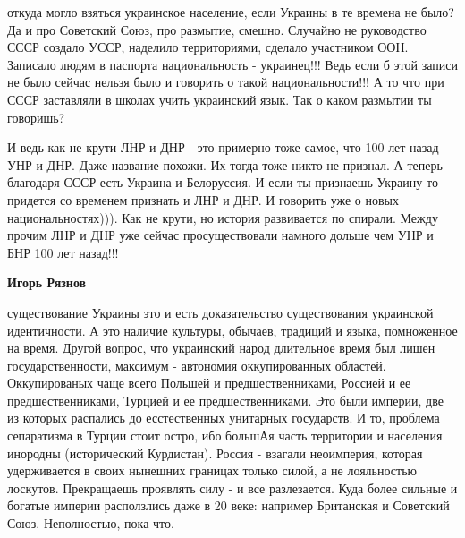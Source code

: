 \begin{itemize}
\begin{itemize}
откуда могло взяться украинское население, если Украины в те времена не было?
Да и про Советский Союз, про размытие, смешно. Случайно не руководство СССР
создало УССР, наделило территориями, сделало участником ООН. Записало людям в
паспорта национальность - украинец!!! Ведь если б этой записи не было сейчас
нельзя было и говорить о такой национальности!!! А то что при СССР заставляли в
школах учить украинский язык. Так о каком размытии ты говоришь?

И ведь как не крути ЛНР и ДНР - это примерно тоже самое, что 100 лет назад УНР
и ДНР. Даже название похожи. Их тогда тоже никто не признал. А теперь благодаря
СССР есть Украина и Белоруссия. И если ты признаешь Украину то придется со
временем признать и ЛНР и ДНР. И говорить уже о новых национальностях))). Как
не крути, но история развивается по спирали. Между прочим ЛНР и ДНР уже сейчас
просуществовали намного дольше чем УНР и БНР 100 лет назад!!!

\textbf{Игорь Рязнов} 

существование Украины это и есть доказательство существования украинской
идентичности. А это наличие культуры, обычаев, традиций и языка, помноженное на
время. Другой вопрос, что украинский народ длительное время был лишен
государственности, максимум - автономия оккупированных областей. Оккупированых
чаще всего Польшей и предшественниками, Россией и ее предшественниками, Турцией
и ее предшественниками. Это были империи, две из которых распались до
есстественных унитарных государств. И то, проблема сепаратизма в Турции стоит
остро, ибо большАя часть территории и населения инородны (исторический
Курдистан). Россия - взагали неоимперия, которая удерживается в своих нынешних
границах только силой, а не лояльностью лоскутов. Прекращаешь проявлять силу -
и все разлезается. Куда более сильные и богатые империи расползлись даже в 20
веке: например Британская и Советский Союз. Неполностью, пока что.


\end{itemize}
\end{itemize}
